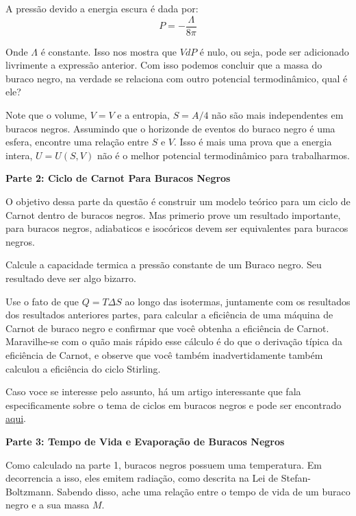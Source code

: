\documentclass[11pt]{article}
\begin{document}
\begin{pproblem}
\begin{alternativas}
        \item A pressão devido a energia escura é dada por:
        \[P = -\frac{\Lambda}{8\pi}\]

        Onde \(\Lambda\) é constante. Isso nos mostra que \(VdP\) é nulo, ou seja, pode ser adicionado livrimente a expressão anterior. Com isso podemos concluir que a massa do buraco negro, na verdade se relaciona com outro potencial termodinâmico, qual é ele? 

        \item Note que o volume, \(V=V\) e a entropia, \(S = A/4\) não são mais independentes em buracos negros. Assumindo que o horizonde de eventos do buraco negro é uma esfera, encontre uma relação entre \(S\) e \(V\). Isso é mais uma prova que a energia intera, \(U = U(S, V)\) não é o melhor potencial termodinâmico para trabalharmos.
    \end{alternativas}

    \centering
    \textbf{Parte 2: Ciclo de Carnot Para Buracos Negros}
    
    \begin{alternativas}
        \item O objetivo dessa parte da questão é construir um modelo teórico para um ciclo de Carnot dentro de buracos negros. Mas primerio prove um resultado importante, para buracos negros, adiabaticos e isocóricos devem ser equivalentes para buracos negros.
        
        \item Calcule a capacidade termica a pressão constante de um Buraco negro. Seu resultado deve ser algo bizarro.
        
        \item Use o fato de que \(Q = T \Delta S\) ao longo das isotermas, juntamente com os resultados dos resultados anteriores partes, para calcular a eficiência de uma máquina de Carnot de buraco negro e confirmar que você
        obtenha a eficiência de Carnot. Maravilhe-se com o quão mais rápido esse cálculo é do que o
        derivação típica da eficiência de Carnot, e observe que você também inadvertidamente
        também calculou a eficiência do ciclo Stirling.

        Caso voce se interesse pelo assunto, há um artigo interessante que fala especificamente sobre o tema de ciclos em buracos negros e pode ser encontrado \href{https://arxiv.org/pdf/1404.5982}{aqui}.
    \end{alternativas}

    \centering
    \textbf{Parte 3: Tempo de Vida e Evaporação de Buracos Negros}
    
    \begin{alternativas}
        \item Como calculado na parte 1, buracos negros possuem uma temperatura. Em decorrencia a isso, eles emitem radiação, como descrita na Lei de Stefan-Boltzmann. Sabendo disso, ache uma relação entre o tempo de vida de um buraco negro e a sua massa \(M\).
    \end{alternativas}

    


\end{pproblem}
\end{document}

